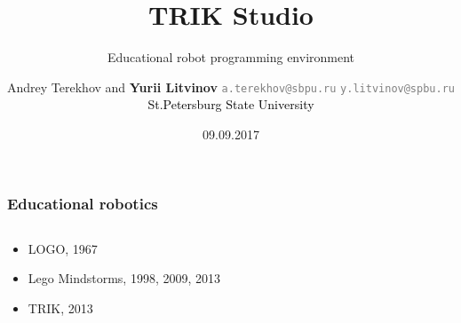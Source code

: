 \documentclass[xetex,mathserif,serif]{beamer}
\title{TRIK Studio}
\subtitle{Educational robot programming environment}
\author[Yurii Litvinov]{Andrey Terekhov and \textbf{Yurii Litvinov} \newline \textcolor{gray}{\small\texttt{a.terekhov@sbpu.ru}} \newline \textcolor{gray}{\small\texttt{y.litvinov@spbu.ru}} \newline \textcolor{black}{\small{St.Petersburg State University}}}
\date{09.09.2017}
\begin{document}
	
	\frame{\titlepage}
	
	\begin{frame}
		\frametitle{Educational robotics}
		\begin{columns}
			\begin{column}{0.5\textwidth}
				\begin{itemize}
					\item LOGO, 1967
					\item Lego Mindstorms, 1998, 2009, 2013
					\item TRIK, 2013
				\end{itemize}
			\end{column}
			\begin{column}{0.5\textwidth}
			\end{column}
		\end{columns}
		\vspace{0.7cm}
	\end{frame}
\end{document}
